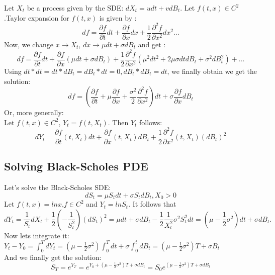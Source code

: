 \documentclass[a4paper]{report}
\begin{document}
\begin{itemize}
Let $X_t$ be a process given by the SDE: $dX_t = udt+vdB_t$. Let $f(t,x) \in C^2$ .Taylor expansion for $f(t,x)$ is given by :
\begin{equation}
df = \frac{\partial f}{\partial t} dt + \frac{\partial f}{\partial x} dx +    \frac{1}{2}  \frac{\partial^2 f}{\partial x^2} dx^2...
\end{equation}
Now, we change  $x \longrightarrow X_t$,   $dx \longrightarrow \mu dt+\sigma dB_t$ and get : 
\begin{equation}
df = \frac{\partial f}{\partial t} dt + 
\frac{\partial f}{\partial x} (\mu dt + \sigma dB_t)  
+  \frac{1}{2}  \frac{\partial^2 f}{\partial x^2} (\mu^2 dt^2+2\mu \sigma dt dB_t+\sigma^2 dB^2_t)+...
\end{equation}
Using $ dt * dt = dt * dB_t = dB_t*dt = 0,  dB_t*dB_t = dt$, we finally obtain we get the solution:
\begin{equation}
df = (\frac{\partial f}{\partial t}  + \mu \frac{\partial f}{\partial x}  +    \frac{\sigma^2}{2}  \frac{\partial^2 f}{\partial x^2}) dt + \sigma \frac{\partial f}{\partial x}dB_t
\end{equation}
Or, more generally:\\
Let $f(t,x) \in C^2$,  $Y_t = f(t,X_t)$. Then $Y_t$ follows:
\begin{equation}
dY_t=\frac{\partial f}{\partial t}(t,X_t)dt + \frac{\partial f}{\partial x}(t,X_t)dB_t + \frac{1}{2} \frac{\partial^2 f}{\partial x^2}(t,X_t)(dB_t)^2
\end{equation}


\subsection{Solving Black-Scholes PDE}
Let's solve the Black-Scholes SDE:
\begin{equation}
dS_t=\mu S_t dt + \sigma S_t dB_t, X_0>0
\end{equation}
Let $f(t,x)=ln x$,$f \in C^2$ and  $Y_t = ln S_t$. It follows that
\begin{equation}
dY_t=\frac{1}{S_t}dX_t+\frac{1}{2}(-\frac{1}{S_t^2})(dS_t)^2
=\mu dt+\sigma dB_t-\frac{1}{2} \frac{1}{X_t^2}\sigma^2S_t^2dt=
(\mu - \frac{1}{2} \sigma^2)dt + \sigma dB_t.
\end{equation}
Now lets integrate it:\\
\newline
$Y_t-Y_0 = \int_0^T dY_t = (\mu - \frac{1}{2} \sigma^2) \int_0^T dt + \sigma \int_0^t dB_t= (\mu - \frac{1}{2} \sigma^2)T + \sigma B_t $\\
\newline
And we finally get the solution:
\begin{equation}
S_T = e^{Y_T}=e^{Y_0+(\mu - \frac{1}{2} \sigma^2)T+\sigma dB_t}=S_0 e^{(\mu - \frac{1}{2} \sigma^2)T+\sigma dB_t }
\end{equation}



\end{itemize}
\end{document}
